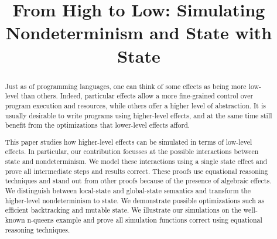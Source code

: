 \documentclass[acmsmall,review,anonymous]{acmart}
\begin{document}
\title{From High to Low: Simulating Nondeterminism and State with State}




\begin{abstract}
  Just as of programming languages, one can think of some effects as being more
  low-level than others. Indeed, particular effects allow a more fine-grained
  control over program execution and resources, while others offer a higher level
  of abstraction. It is usually desirable to
  write programs using higher-level effects, and at the same time still
  benefit from the optimizations that lower-level effects afford.

  This paper studies how higher-level effects can be simulated in terms of low-level effects.
  In particular, our contribution focusses at the possible interactions between
  state and nondeterminism.
  We model these interactions using a single state effect and prove all intermediate
  steps and results correct.
  These proofs use equational reasoning techniques and stand out
  from other proofs because of the presence of algebraic effects. 
  We distinguish between local-state and global-state semantics
  and transform the higher-level nondeterminism to state. We demonstrate
  possible optimizations such as efficient backtracking and mutable state.
  We illustrate our simulations on the well-known n-queens example and
  prove all simulation functions correct using equational reasoning techniques.
\end{abstract}
\end{document}
